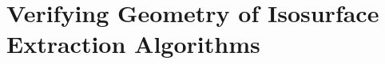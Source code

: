 \chapter{Verifying Geometry of Isosurface Extraction Algorithms}
\label{chap:geometry}


%

%

%

%

%

%
